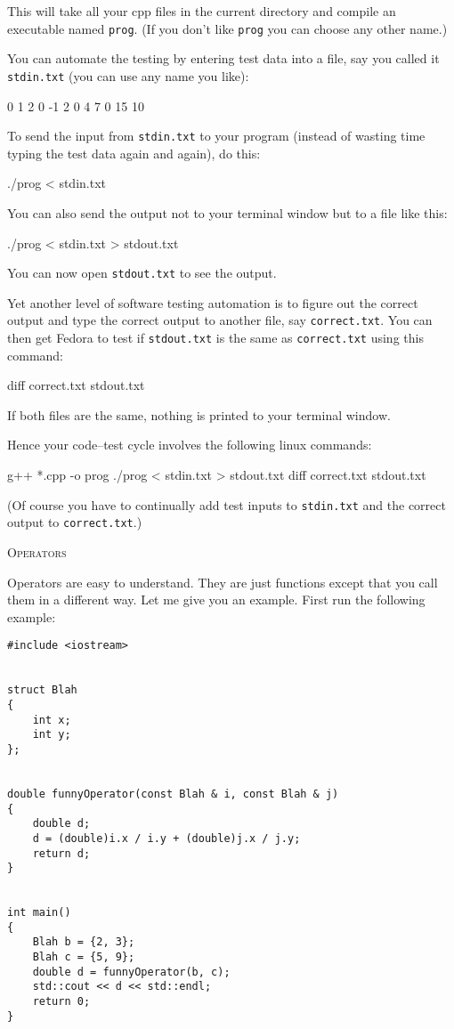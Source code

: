 This will take all your cpp files in the current directory and compile an
executable named \verb!prog!. (If you don't like \verb!prog! you can
choose any other name.)

You can automate the testing by entering test data into a file, say you called
it \verb!stdin.txt! (you can use any name you like):
\begin{console}
0 1 2
0 -1 2
0 4 7
0 15 10
\end{console}

To send the input from \verb!stdin.txt! to your program (instead of wasting
time typing the test data again and again), do this:
\begin{console}
./prog < stdin.txt
\end{console}

You can also send the output not to your terminal window but to a file like
this:
\begin{console}
./prog < stdin.txt > stdout.txt
\end{console}

You can now open \verb!stdout.txt! to see the output.

Yet another level of software testing automation is to figure out the correct
output and type the correct output to another file, say \verb!correct.txt!. You
can then get Fedora to test if \verb!stdout.txt! is the same as
\verb!correct.txt! using this command:
\begin{console}
diff correct.txt stdout.txt
\end{console}
If both files are the same, nothing is printed to your terminal window.

Hence your code--test cycle involves the following linux commands:
\begin{console}
g++ *.cpp -o prog
./prog < stdin.txt > stdout.txt
diff correct.txt stdout.txt
\end{console}

(Of course you have to continually add test inputs to \verb!stdin.txt! and the
correct output to \verb!correct.txt!.)




\newpage
\textsc{Operators}

Operators are easy to understand. They are just functions except that you call
them in a different way. Let me give you an example. First run the following
example:
\begin{Verbatim}[frame=single]
#include <iostream>


struct Blah
{
    int x;
    int y;
};


double funnyOperator(const Blah & i, const Blah & j)
{
    double d;
    d = (double)i.x / i.y + (double)j.x / j.y;
    return d;
}

  
int main()
{
    Blah b = {2, 3};
    Blah c = {5, 9};
    double d = funnyOperator(b, c);
    std::cout << d << std::endl;
    return 0;
}
\end{Verbatim}

